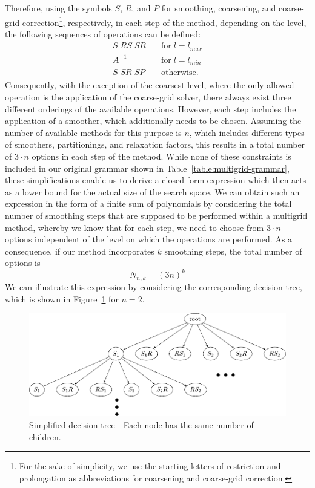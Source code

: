 Therefore, using the symbols $S$, $R$, and $P$ for smoothing, coarsening, and coarse-grid correction\footnote{For the sake of simplicity, we use the starting letters of restriction and prolongation as abbreviations for coarsening and coarse-grid correction.}, respectively, in each step of the method, depending on the level, the following sequences of operations can be defined:
\begin{align*}
	S | RS | SR & \quad \text{for} \; l = l_{max} \\
	A^{-1} & \quad \text{for} \; l = l_{min} \\
	S | SR | SP & \quad \text{otherwise}.
\end{align*}
Consequently, with the exception of the coarsest level, where the only allowed operation is the application of the coarse-grid solver, there always exist three different orderings of the available operations.
However, each step includes the application of a smoother, which additionally needs to be chosen.
Assuming the number of available methods for this purpose is $n$, which includes different types of smoothers, partitionings, and relaxation factors, this results in a total number of $3 \cdot n$ options in each step of the method.
While none of these constraints is included in our original grammar shown in Table~\ref{table:multigrid-grammar}, these simplifications enable us to derive a closed-form expression which then acts as a lower bound for the actual size of the search space.
We can obtain such an expression in the form of a finite sum of polynomials by considering the total number of smoothing steps that are supposed to be performed within a multigrid method, whereby we know that for each step, we need to choose from $3 \cdot n$ options independent of the level on which the operations are performed.
As a consequence, if our method incorporates $k$ smoothing steps, the total number of options is 
\begin{equation}
	N_{n,k} = (3 n)^k
	\label{eq:simplified-number-of-options}
\end{equation}
We can illustrate this expression by considering the corresponding decision tree, which is shown in Figure~\ref{fig:decision-tree} for $n = 2$.
\begin{figure}
	\centering
	\includegraphics[width=\textwidth]{figures/trees/decision_tree_annotated.pdf}
	\caption{Simplified decision tree - Each node has the same number of children.}
	\label{fig:decision-tree}
\end{figure}
